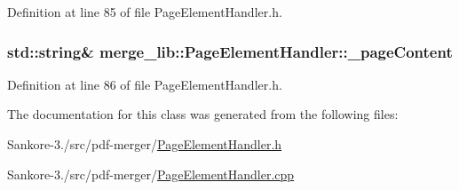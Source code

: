 Definition at line 85 of file Page\-Element\-Handler.\-h.

\hypertarget{classmerge__lib_1_1_page_element_handler_a489f2d42f7bcdae272b81caa93badf14}{
\subsubsection[{\-\_\-page\-Content}]{\setlength{\rightskip}{0pt plus 5cm}std\-::string\& merge\-\_\-lib\-::\-Page\-Element\-Handler\-::\-\_\-page\-Content\hspace{0.3cm}{\ttfamily [protected]}}}\label{da/d91/classmerge__lib_1_1_page_element_handler_a489f2d42f7bcdae272b81caa93badf14}


Definition at line 86 of file Page\-Element\-Handler.\-h.



The documentation for this class was generated from the following files\-:\begin{DoxyCompactItemize}
\item 
Sankore-\/3./src/pdf-\/merger/\hyperlink{_page_element_handler_8h}{Page\-Element\-Handler.\-h}\item 
Sankore-\/3./src/pdf-\/merger/\hyperlink{_page_element_handler_8cpp}{Page\-Element\-Handler.\-cpp}\end{DoxyCompactItemize}
